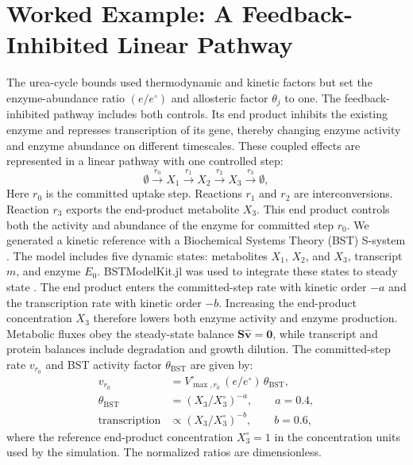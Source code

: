 \section{Worked Example: A Feedback-Inhibited Linear Pathway}\label{sec:feedback}

The urea-cycle bounds used thermodynamic and kinetic factors but set the
enzyme-abundance ratio $(e/e^{\circ})$ and allosteric factor $\theta_j$ to one.
The feedback-inhibited pathway includes both controls. Its end product inhibits
the existing enzyme and represses transcription of its gene, thereby changing
enzyme activity and enzyme abundance on different timescales. These coupled
effects are represented in a linear pathway with one controlled step:
\begin{equation}\label{eq:feedback-network}
  \emptyset \xrightarrow{\,r_0\,} X_1 \xrightarrow{\,r_1\,} X_2
  \xrightarrow{\,r_2\,} X_3 \xrightarrow{\,r_3\,} \emptyset,
\end{equation}
Here $r_0$ is the committed uptake step. Reactions $r_1$ and $r_2$ are
interconversions. Reaction $r_3$ exports the end-product metabolite $X_3$.
This end product controls both the activity and abundance of the enzyme for
committed step $r_0$. We generated a
kinetic reference with a Biochemical Systems Theory (BST)
S-system \cite{Savageau1976,SavageauVoit1987}. The model includes five dynamic
states: metabolites $X_1$, $X_2$, and $X_3$, transcript $m$, and enzyme $E_0$.
BSTModelKit.jl was used to integrate these states to steady state
\cite{Vadhin2026}. The end product enters the committed-step rate with kinetic
order $-a$ and the transcription rate with kinetic order $-b$. Increasing the
end-product concentration $X_3$ therefore lowers both enzyme activity and
enzyme production. Metabolic fluxes obey the steady-state balance
$\mathbf S\hat{\mathbf v}=\mathbf 0$, while transcript and protein
balances include degradation and growth dilution. The committed-step rate
$v_{r_0}$ and BST activity factor $\theta_{\mathrm{BST}}$ are given by:
\begin{equation}\label{eq:feedback-rate}
  \begin{aligned}
    v_{r_0} &=
      V^{\circ}_{\max,r_0}\,(e/e^{\circ})\,\theta_{\mathrm{BST}},\\
    \theta_{\mathrm{BST}} &=
      (X_3/X_3^{\circ})^{-a},\qquad a = 0.4,\\
    \text{transcription} &\propto
      (X_3/X_3^{\circ})^{-b},\qquad b = 0.6,
  \end{aligned}
\end{equation}
where the reference end-product concentration $X_3^{\circ}=1$ in the
concentration units used by the simulation.
The normalized ratios are dimensionless.

